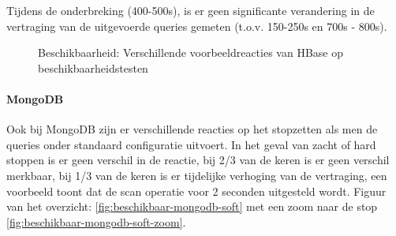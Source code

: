 Tijdens de onderbreking (400-500s), is er geen significante verandering in de vertraging van de uitgevoerde queries gemeten (t.o.v. 150-250s en 700s - 800s). 
\begin{figure}[ht!] 
	\centering
	\caption{Beschikbaarheid: Verschillende voorbeeldreacties van HBase op beschikbaarheidstesten }
	\label{fig:beschikbaar-hbase-1}
\end{figure}

\paragraph{MongoDB}
Ook bij MongoDB zijn er verschillende reacties op het stopzetten als men de queries onder standaard configuratie uitvoert. In het geval van zacht of hard stoppen is er geen verschil in de reactie, bij 2/3 van de keren is er geen verschil merkbaar, bij 1/3 van de keren is er tijdelijke verhoging van de vertraging, een voorbeeld toont dat de scan operatie voor 2 seconden uitgesteld wordt. Figuur van het overzicht: \ref{fig:beschikbaar-mongodb-soft} met een zoom naar de stop \ref{fig:beschikbaar-mongodb-soft-zoom}.

